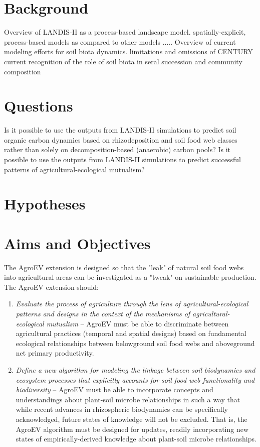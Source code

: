 
\section{Background}
\begin{outline}
\noindent \0 Overview of LANDIS-II as a process-based landscape model.
\1 spatially-explicit, process-based models as compared to other models .....
\1 
\0 Overview of current modeling efforts for soil biota dynamics.
\1 limitations and omissions of CENTURY
\1 current recognition of the role of soil biota in seral succession and community composition 
\end{outline}


\section{Questions}
\begin{outline}
\1 Is it possible to use the outputs from LANDIS-II simulations to predict soil organic carbon dynamics based on rhizodeposition and soil food web classes rather than solely on decomposition-based (anaerobic) carbon pools?
\1 Is it possible to use the outputs from LANDIS-II simulations to predict successful patterns of agricultural-ecological mutualism?
\end{outline}

\section{Hypotheses}



\section{Aims and Objectives}
The AgroEV extension is designed so that the "leak" of natural soil food webs into agricultural areas can be investigated as a "tweak" on sustainable production. The AgroEV extension should:
\begin{enumerate}
  \item \textit{Evaluate the process of agriculture through the lens of agricultural-ecological patterns and designs in the context of the mechanisms of agricultural-ecological mutualism} -- AgroEV must be able to discriminate between agricultural practices (temporal and spatial designs) based on fundamental ecological relationships between belowground soil food webs and aboveground net primary productivity. 
  \item \textit{Define a new algorithm for modeling the linkage between soil biodynamics and ecosystem processes that explicitly accounts for soil food web functionality and biodiversity} -- AgroEV must be able to incorporate concepts and understandings about plant-soil microbe relationships in such a way that while recent advances in rhizospheric biodynamics can be specifically acknowledged, future states of knowledge will not be excluded. That is, the AgroEV algorithm must be designed for updates, readily incorporating new states of empirically-derived knowledge about plant-soil microbe relationships.
\end{enumerate}

